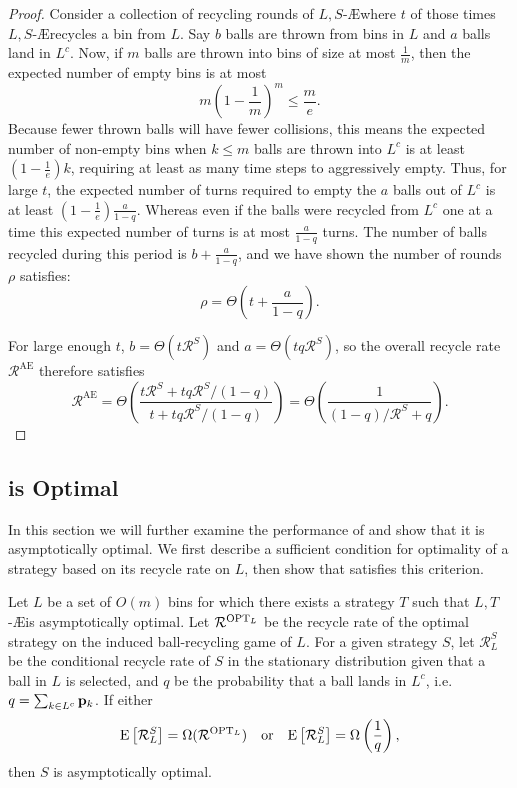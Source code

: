 \begin{proof}
	Consider a collection of recycling rounds of $L,S$-\AE where $t$ of those
	times $L,S$-\AE recycles a bin from $L$. Say $b$ balls are thrown from bins
	in $L$ and $a$ balls land in $L^c$. Now, if $m$ balls are thrown into bins
	of size at most $\frac{1}{m}$, then the expected number of empty bins is at
	most \[ m \left(1 - \frac{1}{m}\right)^m \leq \frac{m}{e}.\] Because fewer
	thrown balls will have fewer collisions, this means the expected number of
	non-empty bins when $k \leq m$ balls are thrown into $L^c$ is at least
	$\left(1-\frac{1}{e}\right)k$, requiring at least as many time steps to
	aggressively empty. Thus, for large $t$, the expected number of turns
	required to empty the $a$ balls out of $L^c$ is at least
	$\left(1-\frac{1}{e}\right)\frac{a}{1-q}$. Whereas even if the balls were
	recycled from $L^c$ one at a time this expected number of turns is at most
	$\frac{a}{1 - q}$ turns. The number of balls recycled during this period is
	$b + \frac{a}{1 - q}$, and we have shown the number of rounds $\rho$
	satisfies: \[\rho = \Theta\left(t + \frac{a}{1-q}\right).\]

	For large enough $t$, $b = \Theta\left(t\mathcal{R}^S\right)$ and
	$a = \Theta\left(tq\mathcal{R}^S\right)$, so the overall recycle rate
	$\mathcal{R}^\textrm{AE}$ therefore satisfies
        \[ \mathcal{R}^\textrm{AE} = \Theta\left(\frac{t\mathcal{R}^S + tq\mathcal{R}^S/(1 - q)}{t + tq\mathcal{R}^S/(1 - q)}\right) = \Theta\left(\frac{1}{(1 - q)/\mathcal{R}^S + q}\right). \]
\end{proof}

\subsection{\RB is Optimal}\label{sec:br-rboptproof}

In this section we will further examine the performance of \RB and show that it
is asymptotically optimal. We first describe a sufficient condition for
optimality of a strategy based on its recycle rate on $L$, then show that \RB
satisfies this criterion.

\begin{lemma}\label{lem:rl-opt}
	Let $L$ be a set of $O(m)$ bins for which there exists a strategy $T$ such
	that $L,T$-\AE is asymptotically optimal.  Let $\mathcal{R}^{\textrm{OPT}_L}$ be
	the recycle rate of the optimal strategy on the induced ball-recycling game
	of $L$.  For a given strategy $S$, let $\mathcal{R}_L^S$ be the conditional
	recycle rate of $S$ in the stationary distribution given that a ball in $L$
	is selected, and $q$ be the probability that a ball lands in $L^c$, i.e. $q
	= \sum_{k \in L^c} \mathbf{p}_k$. If either
	\[ \mathrm{E}\left[\mathcal{R}_L^S\right] = \Omega(\mathcal{R}^{\textrm{OPT}_L})
	\quad\textrm{or}\quad\mathrm{E}\left[\mathcal{R}_L^S\right] =
	\Omega\left(\frac{1}{q}\right),\]
	then $S$ is asymptotically optimal.
\end{lemma}

